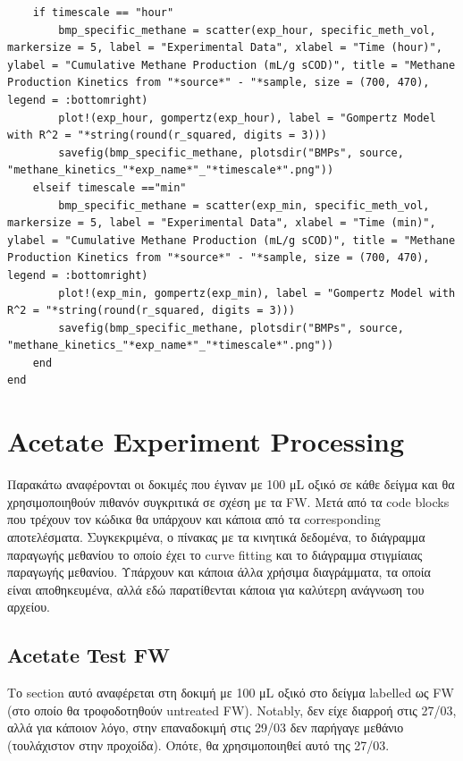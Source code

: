\documentclass[11pt]{article}
\begin{document}
\begin{verbatim}
    if timescale == "hour"
        bmp_specific_methane = scatter(exp_hour, specific_meth_vol, markersize = 5, label = "Experimental Data", xlabel = "Time (hour)", ylabel = "Cumulative Methane Production (mL/g sCOD)", title = "Methane Production Kinetics from "*source*" - "*sample, size = (700, 470), legend = :bottomright)
        plot!(exp_hour, gompertz(exp_hour), label = "Gompertz Model with R^2 = "*string(round(r_squared, digits = 3)))
        savefig(bmp_specific_methane, plotsdir("BMPs", source, "methane_kinetics_"*exp_name*"_"*timescale*".png"))
    elseif timescale =="min" 
        bmp_specific_methane = scatter(exp_min, specific_meth_vol, markersize = 5, label = "Experimental Data", xlabel = "Time (min)", ylabel = "Cumulative Methane Production (mL/g sCOD)", title = "Methane Production Kinetics from "*source*" - "*sample, size = (700, 470), legend = :bottomright)
        plot!(exp_min, gompertz(exp_min), label = "Gompertz Model with R^2 = "*string(round(r_squared, digits = 3)))
        savefig(bmp_specific_methane, plotsdir("BMPs", source, "methane_kinetics_"*exp_name*"_"*timescale*".png"))
    end
end

\end{verbatim}

\section{Acetate Experiment Processing}
\label{sec:org81317fc}
Παρακάτω αναφέρονται οι δοκιμές που έγιναν με 100 μL οξικό σε κάθε δείγμα και θα χρησιμοποιηθούν πιθανόν συγκριτικά σε σχέση με τα FW. Μετά από τα code blocks που τρέχουν τον κώδικα θα υπάρχουν και κάποια από τα corresponding αποτελέσματα. Συγκεκριμένα, ο πίνακας με τα κινητικά δεδομένα, το διάγραμμα παραγωγής μεθανίου το οποίο έχει το curve fitting και το διάγραμμα στιγμίαιας παραγωγής μεθανίου. Υπάρχουν και κάποια άλλα χρήσιμα διαγράμματα, τα οποία είναι αποθηκευμένα, αλλά εδώ παρατίθενται κάποια για καλύτερη ανάγνωση του αρχείου.

\subsection{Acetate Test FW}
\label{sec:org869f1e6}
Το section αυτό αναφέρεται στη δοκιμή με 100 μL οξικό στο δείγμα labelled ως FW (στο οποίο θα τροφοδοτηθούν untreated FW). Notably, δεν είχε διαρροή στις 27/03, αλλά για κάποιον λόγο, στην επαναδοκιμή στις 29/03 δεν παρήγαγε μεθάνιο (τουλάχιστον στην προχοίδα). Οπότε, θα χρησιμοποιηθεί αυτό της 27/03.
\end{document}

